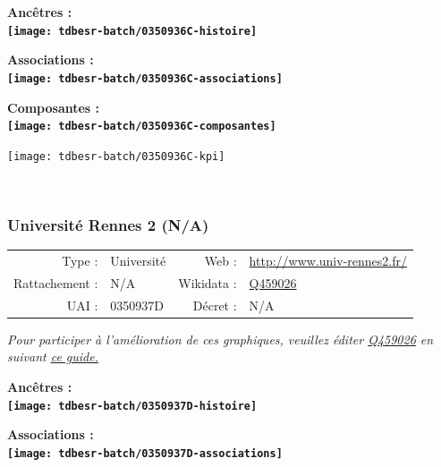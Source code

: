 \documentclass[12pt,french,]{article}
\begin{document}
\vspace{1cm}  
\begin{minipage}[b]{0.50\textwidth}\begin{center} \bf Ancêtres : \\  
\texttt{[image: tdbesr-batch/0350936C-histoire]} \end{center}\end{minipage}\begin{minipage}[b]{0.50\textwidth}\begin{center} \bf Associations : \\  
\texttt{[image: tdbesr-batch/0350936C-associations]} \end{center}\end{minipage}

\hrulefill

\begin{center} \bf Composantes : \\  
\texttt{[image: tdbesr-batch/0350936C-composantes]} \end{center}

\begin{center}\texttt{[image: tdbesr-batch/0350936C-kpi]} \end{center}\checkoddpage

\ifoddpage \fi ~\newpage  

\hypertarget{universituxe9-rennes-2-na}{%
\subsubsection{Université Rennes 2
(N/A)}\label{universituxe9-rennes-2-na}}

\begin{tabular*}{\textwidth}{rp{5cm}rl}  
\hline  
Type : & Université & Web : &\href{http://www.univ-rennes2.fr/}{http://www.univ-rennes2.fr/} \\  
Rattachement : & N/A & Wikidata : & \href{https://www.wikidata.org/entity/Q459026}{Q459026} \\  
UAI : & 0350937D & Décret : & N/A \\  
\hline  
\end{tabular*}

\textit{\scriptsize Pour participer à l'amélioration de ces graphiques, veuillez éditer  \href{https://www.wikidata.org/entity/Q459026}{Q459026}  en suivant \href{https://github.com/cpesr/wikidataESR/blob/master/Rmd/wikidataESR.md}{ce guide.}}

\vspace{1cm}  
\begin{minipage}[b]{0.50\textwidth}\begin{center} \bf Ancêtres : \\  
\texttt{[image: tdbesr-batch/0350937D-histoire]} \end{center}\end{minipage}\begin{minipage}[b]{0.50\textwidth}\begin{center} \bf Associations : \\  
\texttt{[image: tdbesr-batch/0350937D-associations]} \end{center}\end{minipage}
\end{document}
